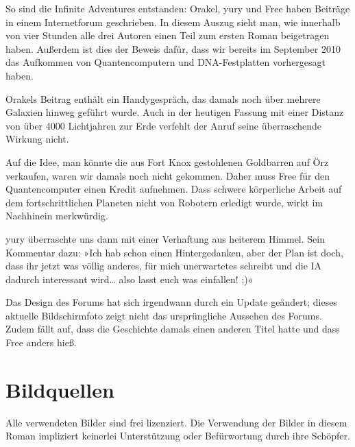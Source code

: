 So sind die Infinite Adventures entstanden: Orakel, yury und Free haben Beiträge in einem Internetforum geschrieben. In diesem Auszug sieht man, wie innerhalb von vier Stunden alle drei Autoren einen Teil zum ersten Roman beigetragen haben. Außerdem ist dies der Beweis dafür, dass wir bereits im September 2010 das Aufkommen von Quantencomputern und DNA-Festplatten vorhergesagt haben.

Orakels Beitrag enthält ein Handygespräch, das damals noch über mehrere Galaxien hinweg geführt wurde. Auch in der heutigen Fassung mit einer Distanz von über 4000 Lichtjahren zur Erde verfehlt der Anruf seine überraschende Wirkung nicht.

Auf die Idee, man könnte die aus Fort Knox gestohlenen Goldbarren auf Örz verkaufen, waren wir damals noch nicht gekommen. Daher muss Free für den Quantencomputer einen Kredit aufnehmen. Dass schwere körperliche Arbeit auf dem fortschrittlichen Planeten nicht von Robotern erledigt wurde, wirkt im Nachhinein merkwürdig.

yury überraschte uns dann mit einer Verhaftung aus heiterem Himmel. Sein Kommentar dazu: »Ich hab schon einen Hintergedanken, aber der Plan ist doch, dass ihr jetzt was völlig anderes, für mich unerwartetes schreibt und die IA dadurch interessant wird… also lasst euch was einfallen! ;)«

Das Design des Forums hat sich irgendwann durch ein Update geändert; dieses aktuelle Bildschirmfoto zeigt nicht das ursprüngliche Aussehen des Forums. Zudem fällt auf, dass die Geschichte damals einen anderen Titel hatte und dass Free anders hieß.



\chapter{Bildquellen}

Alle verwendeten Bilder sind frei lizenziert. Die Verwendung der Bilder in diesem Roman impliziert keinerlei Unterstützung oder Befürwortung durch ihre Schöpfer.

